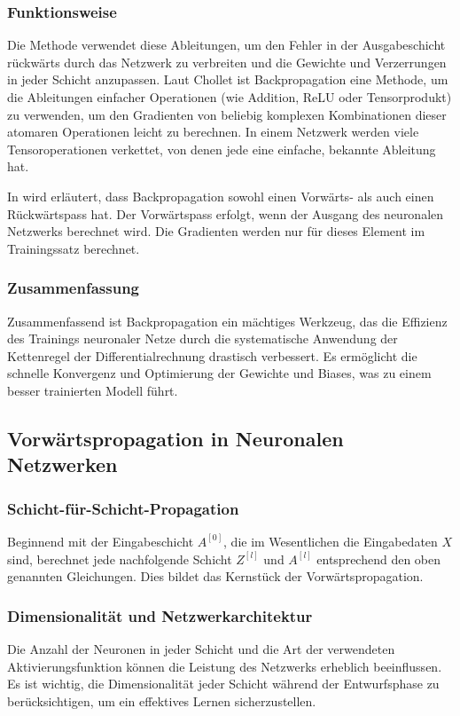 \subsubsection{Funktionsweise}

Die Methode verwendet diese Ableitungen, um den Fehler in der Ausgabeschicht rückwärts durch das Netzwerk zu verbreiten und die Gewichte und Verzerrungen in jeder Schicht anzupassen. Laut Chollet \cite[p.~80]{Chollet2021} ist Backpropagation eine Methode, um die Ableitungen einfacher Operationen (wie Addition, ReLU oder Tensorprodukt) zu verwenden, um den Gradienten von beliebig komplexen Kombinationen dieser atomaren Operationen leicht zu berechnen. In einem Netzwerk werden viele Tensoroperationen verkettet, von denen jede eine einfache, bekannte Ableitung hat.

In \cite[p.~43]{heaton_2012} wird erläutert, dass Backpropagation sowohl einen Vorwärts- als auch einen Rückwärtspass hat. Der Vorwärtspass erfolgt, wenn der Ausgang des neuronalen Netzwerks berechnet wird. Die Gradienten werden nur für dieses Element im Trainingssatz berechnet.

\subsubsection{Zusammenfassung}

Zusammenfassend ist Backpropagation ein mächtiges Werkzeug, das die Effizienz des Trainings neuronaler Netze durch die systematische Anwendung der Kettenregel der Differentialrechnung drastisch verbessert. Es ermöglicht die schnelle Konvergenz und Optimierung der Gewichte und Biases, was zu einem besser trainierten Modell führt.


\subsection{Vorwärtspropagation in Neuronalen Netzwerken}
\subsubsection{Schicht-für-Schicht-Propagation}
Beginnend mit der Eingabeschicht \( A^{[0]} \), die im Wesentlichen die Eingabedaten \( X \) sind, berechnet jede nachfolgende Schicht \( Z^{[l]} \) und \( A^{[l]} \) entsprechend den oben genannten Gleichungen. Dies bildet das Kernstück der Vorwärtspropagation.

\subsubsection{Dimensionalität und Netzwerkarchitektur}
Die Anzahl der Neuronen in jeder Schicht und die Art der verwendeten Aktivierungsfunktion können die Leistung des Netzwerks erheblich beeinflussen. Es ist wichtig, die Dimensionalität jeder Schicht während der Entwurfsphase zu berücksichtigen, um ein effektives Lernen sicherzustellen.

